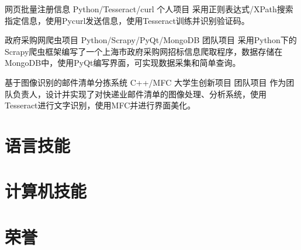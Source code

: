 \documentclass[11pt,a4paper]{moderncv}
\begin{document}
{网页批量注册信息}
{Python/Tesseract/curl}
{个人项目}{}
{采用正则表达式/XPath搜索指定信息，使用Pycurl发送信息，使用Tesseract训练并识别验证码。}

{政府采购网爬虫项目}
{Python/Scrapy/PyQt/MongoDB}
{团队项目}{}
{采用Python下的Scrapy爬虫框架编写了一个上海市政府采购网招标信息爬取程序，数据存储在MongoDB中，使用PyQt编写界面，可实现数据采集和简单查询。}

{基于图像识别的邮件清单分拣系统}
{C++/MFC}
{大学生创新项目 团队项目}{}
{作为团队负责人，设计并实现了对快递业邮件清单的图像处理、分析系统，使用Tesseract进行文字识别，使用MFC并进行界面美化。}


\section{语言技能}

\section{计算机技能}


\section{荣誉} %

\closesection{}                   %
\renewcommand{\listitemsymbol}{-} %
\end{document}
